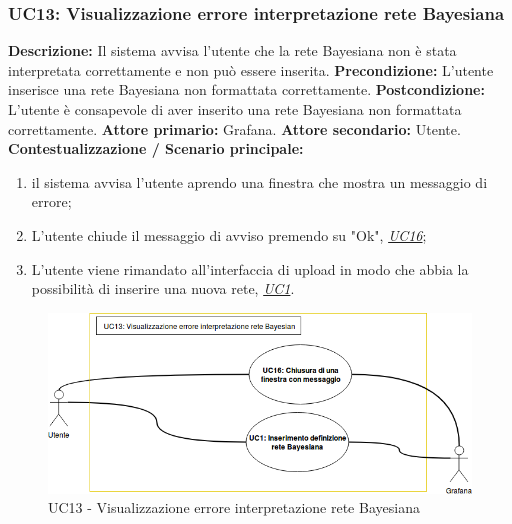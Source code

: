                 \subsubsection{UC13: Visualizzazione errore interpretazione rete Bayesiana}
                    \textbf{Descrizione:} Il sistema avvisa l’utente che la rete Bayesiana non è stata interpretata correttamente e non può essere inserita.
                    \newline
                    \textbf{Precondizione:} L’utente inserisce una rete Bayesiana non formattata correttamente.
                    \newline
                    \textbf{Postcondizione:} L’utente è consapevole di aver inserito una rete Bayesiana non formattata correttamente.
                    \newline
                    \textbf{Attore primario:} Grafana.
                    \newline
                    \textbf{Attore secondario:} Utente.
                    \newline
                    \textbf{Contestualizzazione / Scenario principale:} \begin{enumerate}
                            \item il sistema avvisa l'utente aprendo una finestra che mostra un messaggio di errore;
                            \item L'utente chiude il messaggio di avviso premendo su "Ok", \underline{\textit{UC16}};
                            \item L'utente viene rimandato all'interfaccia di upload in modo che abbia la possibilità di inserire una nuova rete, \underline{\textit{UC1}}.
                        \end{enumerate}
                
                \begin{figure}[!htbp]
                    	\centering
                    	\includegraphics[width=\textwidth]{UC13.png}
                    	\caption{UC13 - Visualizzazione errore interpretazione rete Bayesiana}
                    	\label{uc11}
                    \end{figure}
                    
